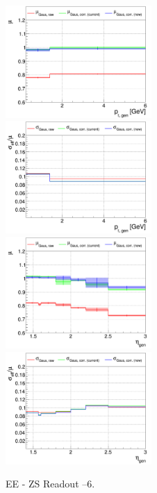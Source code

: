 \begin{figure}
\includegraphics[width=0.495\textwidth]{./plots_pdf/ECAL_plots/plotsNoPU/EE/pdf/ZS/GENPT/EEZS_GENPT_0000_0006_MuOverBins.pdf}
\includegraphics[width=0.495\textwidth]{./plots_pdf/ECAL_plots/plotsNoPU/EE/pdf/ZS/GENPT/EEZS_GENPT_0000_0006_EffSigmaOverBins.pdf}
\includegraphics[width=0.495\textwidth]{./plots_pdf/ECAL_plots/plotsNoPU/EE/pdf/ZS/GENETA/EEZS_GENETA_0000_0006_MuOverBins.pdf}
\includegraphics[width=0.495\textwidth]{./plots_pdf/ECAL_plots/plotsNoPU/EE/pdf/ZS/GENETA/EEZS_GENETA_0000_0006_EffSigmaOverBins.pdf}
\caption[Energy response of PF ECAL cluster for NoPU EE ZS readout senario]{EE - ZS Readout --6\GeV.}
\end{figure}

